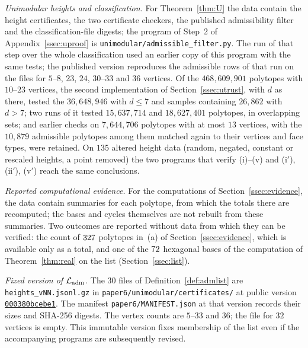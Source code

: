 \emph{Unimodular heights and classification.} For Theorem~\ref{thm:U} the data contain the height certificates, the two certificate checkers, the published admissibility
filter and the classification-file digests; the program of Step~2 of Appendix~\ref{ssec:uproof} is
\texttt{unimodular/\allowbreak admissible\_\allowbreak filter.py}. The run of that step over the whole classification used an
earlier copy of this program with the same tests; the published version reproduces the admissible rows of that run on the files for $5$--$8$, $23$,
$24$, $30$--$33$ and $36$ vertices. Of the $468{,}609{,}901$ polytopes with $10$--$23$ vertices, the second implementation
of Section~\ref{ssec:utrust}, with $d$ as there, tested the $36{,}648{,}946$ with $d\le7$ and samples containing $26{,}862$ with $d>7$; two runs of it tested
$15{,}637{,}714$ and $18{,}627{,}401$ polytopes, in overlapping sets; and earlier checks on $7{,}644{,}706$ polytopes with
at most $13$ vertices, with the $10{,}879$ admissible polytopes among them matched again to their vertices and face types,
were retained. On $135$ altered height data (random, negated, constant or rescaled heights, a point removed) the two
programs that verify (i)--(v) and (i$'$), (ii$'$), (v$'$) reach the same conclusions.

\emph{Reported computational evidence.} For the computations of Section~\ref{ssec:evidence}, the data contain summaries for each polytope,
from which the totals there are recomputed; the bases and cycles themselves are not rebuilt from these summaries. Two
outcomes are reported without data from which they can be verified: the count of $327$ polytopes in~(a) of
Section~\ref{ssec:evidence}, which is available only as a total, and one of the $72$ hexagonal bases of the
computation of Theorem~\ref{thm:real} on the list (Section~\ref{ssec:list}).

\emph{Fixed version of $\mathcal L_{\rm adm}$.} The $30$ files of Definition~\ref{def:admlist} are
\texttt{heights\_vNN.jsonl.gz} in \texttt{paper6/}\allowbreak\texttt{unimodular/}\allowbreak\texttt{certificates/} at public version
\href{https://github.com/bwuebben/calabi-yau-smoothability/tree/000380bcebe1f7beed6f3db0e6f16c8a79307243/paper6/unimodular/certificates}{\texttt{000380bcebe1}}.
The manifest \texttt{paper6/MANIFEST.json} at that version records their sizes and SHA-256 digests. The vertex counts
are $5$--$33$ and $36$; the file for $32$ vertices is empty. This immutable version fixes membership of the list even
if the accompanying programs are subsequently revised.

